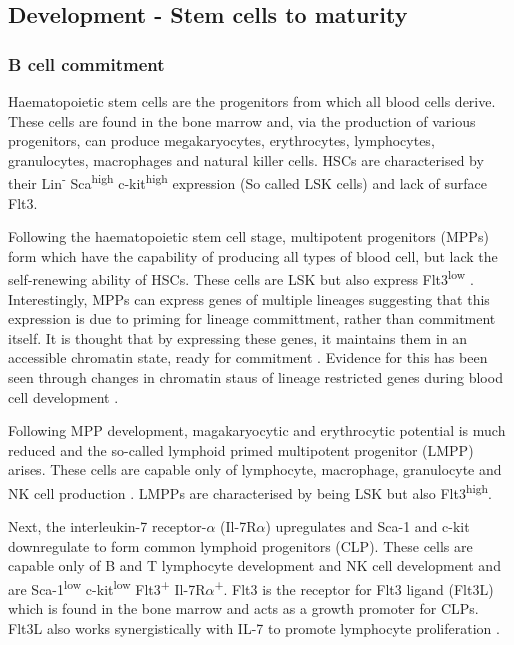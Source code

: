\subsection{Development - Stem cells to maturity}
\label{subsec:Bcelldevelopment}
\subsubsection{B cell commitment}

Haematopoietic stem cells are the progenitors from which all blood cells derive.
These cells are found in the bone marrow and, via the production of various progenitors, can produce megakaryocytes, erythrocytes, lymphocytes, granulocytes, macrophages and natural killer cells.
HSCs are characterised by their Lin\textsuperscript{-} Sca\textsuperscript{high} c-kit\textsuperscript{high} expression (So called LSK cells) and lack of surface Flt3\citep{Welinder2011}.

Following the haematopoietic stem cell stage, multipotent progenitors (MPPs) form which have the capability of producing all types of blood cell, but lack the self-renewing ability of HSCs.
These cells are LSK but also express Flt3\textsuperscript{low} \citep{Welinder2011}.
Interestingly, MPPs can express genes of multiple lineages \citep{Hu1997} suggesting that this expression is due to priming for lineage committment, rather than commitment itself.
It is thought that by expressing these genes, it maintains them in an accessible chromatin state, ready for commitment \citep{Welinder2011}.
Evidence for this has been seen through changes in chromatin staus of lineage restricted genes during blood cell development \citep{Weishaupt2010}.

Following MPP development, magakaryocytic and erythrocytic potential is much reduced and the so-called lymphoid primed multipotent progenitor (LMPP) arises.
These cells are capable only of lymphocyte, macrophage, granulocyte and NK cell production \citep{Adolfsson2005}.
LMPPs are characterised by being LSK but also Flt3\textsuperscript{high}.

Next, the interleukin-7 receptor-$\alpha$ (Il-7R$\alpha$) upregulates and Sca-1 and c-kit downregulate to form common lymphoid progenitors (CLP).
These cells are capable only of B and T lymphocyte development and NK cell development \citep{Kondo1997} and are Sca-1\textsuperscript{low} c-kit\textsuperscript{low} Flt3\textsuperscript{+} Il-7R$\alpha$\textsuperscript{+}.
Flt3 is the receptor for Flt3 ligand (Flt3L) which is found in the bone marrow and acts as a growth promoter for CLPs.
Flt3L also works synergistically with IL-7 to promote lymphocyte proliferation \citep{Holmes2006}.

